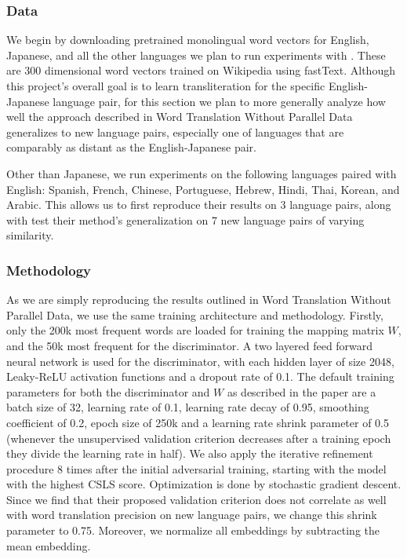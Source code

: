 \documentclass{article}
\begin{document}
\subsubsection*{Data}

We begin by downloading pretrained monolingual word vectors for English, Japanese,
and all the other languages we plan to run experiments with \cite{bojanowski2017enriching}.
These are 300 dimensional word vectors trained on Wikipedia using fastText.
Although this project's overall goal is to learn transliteration for the specific
English-Japanese language pair, for this section we plan to more generally analyze
how well the approach described in Word Translation Without Parallel Data generalizes
to new language pairs, especially one of languages that are comparably as distant as
the English-Japanese pair.

Other than Japanese, we run experiments on the following languages paired with English:
Spanish, French, Chinese, Portuguese, Hebrew, Hindi, Thai, Korean, and Arabic. This
allows us to first reproduce their results on 3 language pairs, along with test their
method's generalization on 7 new language pairs of varying similarity.

\subsubsection*{Methodology}

As we are simply reproducing the results outlined in Word Translation Without Parallel
Data, we use the same training architecture and methodology. Firstly, only the 200k
most frequent words are loaded for training the mapping matrix $W$, and the 50k most
frequent for the discriminator. A two layered feed forward neural network is used
for the discriminator, with each hidden layer of size 2048, Leaky-ReLU activation
functions and a dropout rate of 0.1. The default training parameters for
both the discriminator and $W$ as described in the paper are a
batch size of 32, learning rate of 0.1, learning rate decay of 0.95, smoothing
coefficient of 0.2, epoch size of 250k and a learning rate shrink parameter of 0.5
(whenever the unsupervised validation criterion decreases after a training epoch
they divide the learning rate in half). We also apply the iterative refinement
procedure 8 times after the initial adversarial training, starting with the model with
the highest CSLS score. Optimization is done by stochastic gradient descent.
Since we find that their proposed validation
criterion does not correlate as well with word translation precision on new language
pairs, we change this shrink parameter to 0.75. Moreover, we normalize all embeddings
by subtracting the mean embedding.
\end{document}
